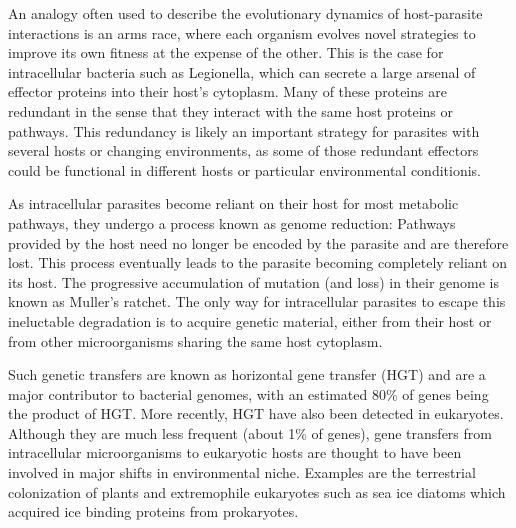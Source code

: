 An analogy often used to describe the evolutionary dynamics of host-parasite interactions is an arms race, where each organism evolves novel strategies to improve its own fitness at the expense of the other. This is the case for intracellular bacteria such as Legionella, which can secrete a large arsenal of effector proteins into their host's cytoplasm. Many of these proteins are redundant in the sense that they interact with the same host proteins or pathways. This redundancy is likely an important strategy for parasites with several hosts or changing environments, as some of those redundant effectors could be functional in different hosts or particular environmental conditionis.

As intracellular parasites become reliant on their host for most metabolic pathways, they undergo a process known as genome reduction: Pathways provided by the host need no longer be encoded by the parasite and are therefore lost. This process eventually leads to the parasite becoming completely reliant on its host. The progressive accumulation of mutation (and loss) in their genome is known as Muller's ratchet. The only way for intracellular parasites to escape this ineluctable degradation is to acquire genetic material, either from their host or from other microorganisms sharing the same host cytoplasm.

Such genetic transfers are known as horizontal gene transfer (HGT) and are a major contributor to bacterial genomes, with an estimated 80\% of genes being the product of HGT. More recently, HGT have also been detected in eukaryotes. Although they are much less frequent (about 1\% of genes), gene transfers from intracellular microorganisms to eukaryotic hosts are thought to have been involved in major shifts in environmental niche. Examples are the terrestrial colonization of plants and extremophile eukaryotes such as sea ice diatoms which acquired ice binding proteins from prokaryotes.